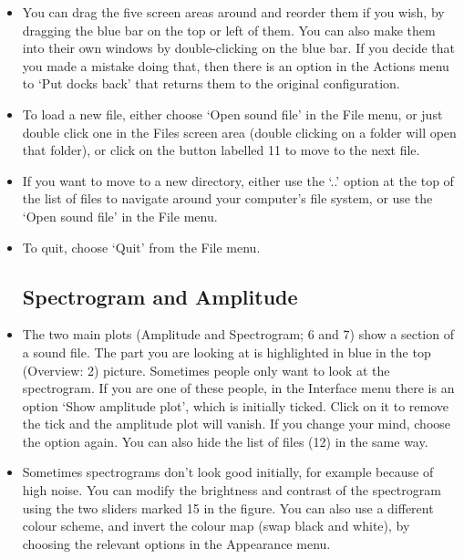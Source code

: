 \documentclass{article}
\begin{document}
\begin{itemize}
\item You can drag the five screen areas around and reorder them if you wish, by dragging the blue bar on the top or left of them. You can also make them into their own windows by double-clicking on the blue bar. If you decide that you made a mistake doing that, then there is an option in the Actions menu to `Put docks back' that returns them to the original configuration.

\item To load a new file, either choose `Open sound file' in the File menu, or just double click one in the Files screen area (double clicking on a folder will open that folder), or click on the button labelled 11 to move to the next file. 

\item If you want to move to a new directory, either use the `..' option at the top of the list of files to navigate around your computer's file system, or use the  `Open sound file' in the File menu.

\item To quit, choose `Quit' from the File menu. 


\subsection{Spectrogram and Amplitude}

\item The two main plots (Amplitude and Spectrogram; 6 and 7) show a section of a sound file. The part you are looking at is highlighted in blue in the top (Overview: 2) picture. Sometimes people only want to look at the spectrogram. If you are one of these people, in the Interface menu there is an option `Show amplitude plot', which is initially ticked. Click on it to remove the tick and the amplitude plot will vanish. If you change your mind, choose the option again. You can also hide the list of files (12) in the same way. 

\item Sometimes spectrograms don't look good initially, for example because of high noise. You can modify the brightness and contrast of the spectrogram using the two sliders marked 15 in the figure. You can also use a different colour scheme, and invert the colour map (swap black and white), by choosing the relevant options in the Appearance menu. 


\end{itemize}
\end{document}

